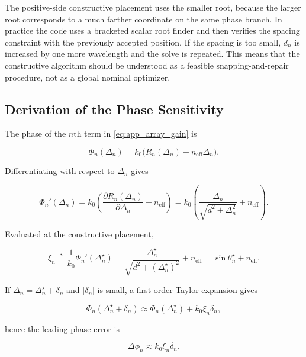 The positive-side constructive placement uses the smaller root, because the larger root corresponds to a much farther coordinate on the same phase branch. In practice the code uses a bracketed scalar root finder and then verifies the spacing constraint with the previously accepted position. If the spacing is too small, $d_n$ is increased by one more wavelength and the solve is repeated. This means that the constructive algorithm should be understood as a feasible snapping-and-repair procedure, not as a global nominal optimizer.

\subsection{Derivation of the Phase Sensitivity}

The phase of the $n$th term in \eqref{eq:app_array_gain} is

\begin{equation}
\Phi_n(\Delta_n)=k_0\big(R_n(\Delta_n)+n_{\mathrm{eff}}\Delta_n\big).
\label{eq:app_phase}
\end{equation}

Differentiating with respect to $\Delta_n$ gives

\begin{equation}
\Phi_n'(\Delta_n)
= k_0 \left(\frac{\partial R_n(\Delta_n)}{\partial \Delta_n}+n_{\mathrm{eff}}\right)
= k_0\left(\frac{\Delta_n}{\sqrt{d^2+\Delta_n^2}}+n_{\mathrm{eff}}\right).
\label{eq:app_phase_derivative}
\end{equation}

Evaluated at the constructive placement,

\begin{equation}
\xi_n
\triangleq \frac{1}{k_0}\Phi_n'(\Delta_n^\star)
= \frac{\Delta_n^\star}{\sqrt{d^2+(\Delta_n^\star)^2}}+n_{\mathrm{eff}}
= \sin\theta_n^\star+n_{\mathrm{eff}}.
\label{eq:app_xi}
\end{equation}

If $\Delta_n = \Delta_n^\star+\delta_n$ and $|\delta_n|$ is small, a first-order Taylor expansion gives

\begin{equation}
\Phi_n(\Delta_n^\star+\delta_n)
\approx \Phi_n(\Delta_n^\star)+k_0 \xi_n \delta_n,
\label{eq:app_taylor}
\end{equation}

hence the leading phase error is

\begin{equation}
\Delta\phi_n \approx k_0 \xi_n \delta_n.
\label{eq:app_phase_error}
\end{equation}

